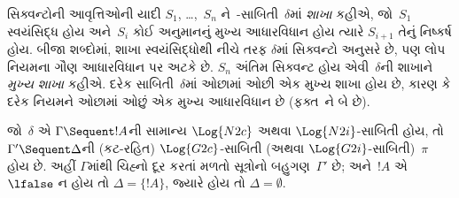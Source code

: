 સિક્વન્ટોની
આવૃત્તિઓની
યાદી
$S_1$, \dots,~$S_n$
ને~-સાબિતી~$\delta$માં
\emph{શાખા} કહીએ,
જો~$S_1$
સ્વયંસિદ્ધ હોય
અને~$S_i$
કોઈ અનુમાનનું
મુખ્ય આધારવિધાન
હોય ત્યારે
$S_{i+1}$
તેનું નિષ્કર્ષ
હોય. બીજા
શબ્દોમાં, શાખા
સ્વયંસિદ્ધોથી
નીચે તરફ
$\delta$માં
સિક્વન્ટો અનુસરે
છે, પણ
લોપ
નિયમના ગૌણ
આધારવિધાન પર
અટકે છે.
$S_n$ અંતિમ
સિક્વન્ટ હોય
એવી~$\delta$ની
શાખાને
\emph{મુખ્ય શાખા}
કહીએ. દરેક
સાબિતી~$\delta$માં
ઓછામાં ઓછી
એક મુખ્ય શાખા
હોય છે, કારણ
કે દરેક નિયમને
ઓછામાં ઓછું
એક મુખ્ય
આધારવિધાન છે
(ફક્ત~\Intro{\land}ને
બે છે).


\begin{prop}
જો~$\delta$ એ
$\Gamma \Sequent !A$ની
સામાન્ય
$\Log{N2c}$ અથવા
$\Log{N2i}$-સાબિતી
હોય, તો
$\Gamma' \Sequent \Delta$ની
(કટ-રહિત)
$\Log{G2c}$-સાબિતી
(અથવા
$\Log{G2i}$-સાબિતી)~$\pi$
હોય છે. અહીં
$\Gamma$માંથી
ચિહ્નો દૂર કરતાં
મળતો સૂત્રોનો
બહુગણ~$\Gamma'$
છે; અને~$!A$
એ~$\lfalse$
ન હોય તો
$\Delta = \{!A\}$,
જ્યારે હોય તો
$\Delta = \emptyset$.
\end{prop}

